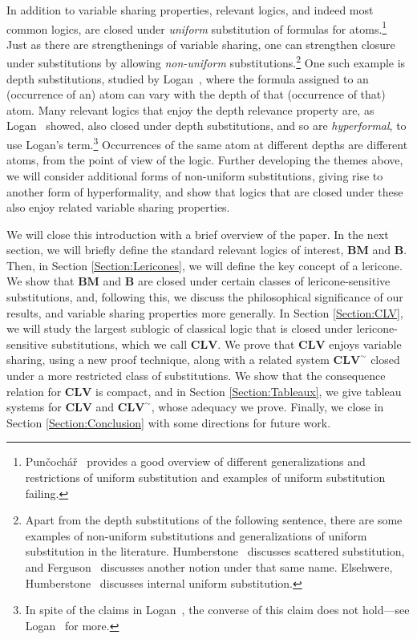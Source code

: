 \documentclass{amsart}
\theoremstyle{definition}
\newcommand{\logic}[1]{{\ensuremath {\mathbf{#1}}}}
\begin{document}
In addition to variable sharing properties, relevant logics, and indeed most common logics, are closed under \emph{uniform} substitution of formulas for atoms.\footnote{Pun\v{c}och\'a\v{r}~\citeyearpar{Puncochar2023-PUNLFS} provides a good overview of different generalizations and restrictions of uniform substitution and examples of uniform substitution failing.} Just as there are strengthenings of variable sharing, one can strengthen closure under substitutions by allowing \emph{non-uniform} substitutions.\footnote{Apart from the depth substitutions of the following sentence, there are some examples of non-uniform substitutions and generalizations of uniform substitution in the literature. Humberstone~\citeyearpar{Humberstone2005-LLOFWO} discusses scattered substitution, and Ferguson~\citeyearpar{Ferguson2017-FERDQO} discusses another notion under that same name. Elsehwere, Humberstone~\citeyearpar{Humberstone:2005aa} discusses internal uniform substitution. 
} 
One such example is depth substitutions, studied by Logan~\citeyearpar{logan2021}, where the formula assigned to an (occurrence of an) atom can vary with the depth of that (occurrence of that) atom. Many relevant logics that enjoy the depth relevance property are, as Logan~\citeyearpar{logan2021} showed, also closed under depth substitutions, and so are \emph{hyperformal}, to use Logan's term.\footnote{In spite of the claims in Logan~\citeyearpar{logan2021}, the converse of this claim does not hold---see Logan~\citeyearpar{logan2023correction} for more.} Occurrences of the same atom at different depths are different atoms, from the point of view of the logic. 
Further developing the themes above, we will consider additional forms of non-uniform substitutions, giving rise to another form of hyperformality, and show that logics that are closed under these also enjoy related variable sharing properties. 

We will close this introduction with a brief overview of the paper. In the next section, we will briefly define the standard relevant logics of interest, $\logic{BM} $ and $\logic{B}$. Then, in Section \ref{Section:Lericones}, we will define the key concept of a lericone. We show that $\logic{BM} $ and $\logic{B}$ are closed under certain classes of lericone-sensitive substitutions, and, following this, we discuss the philosophical significance of our results, and variable sharing properties more generally. In Section \ref{Section:CLV}, we will study the largest sublogic of classical logic that is closed under lericone-sensitive substitutions, which we call $\logic{CLV}$. We prove that $\logic{CLV}$ enjoys variable sharing, using a new proof technique, along with a related system $\mathbf{CLV}^{\sim}$ closed under a more restricted class of substitutions. We show that the consequence relation for $\logic{CLV}$ is compact, and in Section \ref{Section:Tableaux}, we give tableau systems for $\logic{CLV}$ and $\mathbf{CLV}^{\sim}$, whose adequacy we prove. Finally, we close in Section \ref{Section:Conclusion} with some directions for future work.
\end{document}
